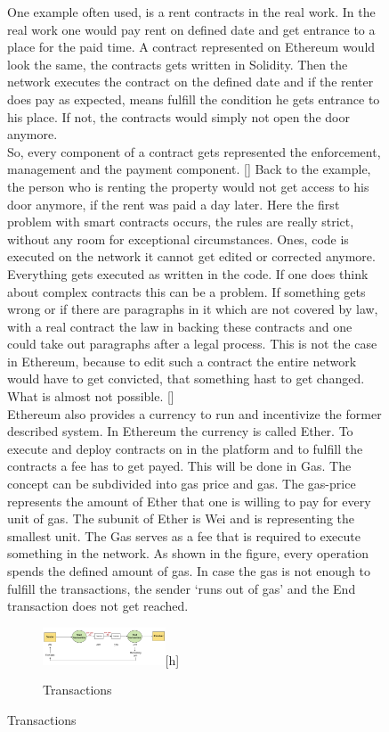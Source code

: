 \begin{figure}[ht]
One example often used, is a rent contracts in the real work. In the real work one would pay rent on defined date and get entrance to a place for the paid time. A contract represented on Ethereum would look the same, the contracts gets written in Solidity. Then the network executes the contract on the defined date and if the renter does pay as expected, means fulfill the condition he gets entrance to his place. If not, the contracts would simply not open the door anymore. 
\\
So, every component of a contract gets represented the enforcement, management and the payment component. [] Back to the example, the person who is renting the property would not get access to his door anymore, if the rent was paid a day later. Here the first problem with smart contracts occurs, the rules are really strict, without any room for exceptional circumstances. Ones, code is executed on the network it cannot get edited or corrected anymore. 
Everything gets executed as written in the code. If one does think about complex contracts this can be a problem. If something gets wrong or if there are paragraphs in it which are not covered by law, with a real contract the law in backing these contracts and one could take out paragraphs after a legal process. This is not the case in Ethereum, because to edit such a contract the entire network would have to get convicted, that something hast to get changed. What is almost not possible. []
\\
Ethereum also provides a currency to run and incentivize the former described system. In Ethereum the currency is called Ether. To execute and deploy contracts on in the platform and to fulfill the contracts a fee has to get payed. This will be done in Gas. The concept can be subdivided into gas price and gas. The gas-price represents the amount of Ether that one is willing to pay for every unit of gas. The subunit of Ether is Wei and is representing the smallest unit. The Gas serves as a fee that is required to execute something in the network. As shown in the figure, every operation spends the defined amount of gas. In case the gas is not enough to fulfill the transactions, the sender ‘runs out of gas’ and the End transaction does not get reached. 

\begin{figure}
\caption{Transactions} 
\includegraphics[width=0.4\textwidth]{gastransactions}[h]
\end{figure}


\end{figure}
